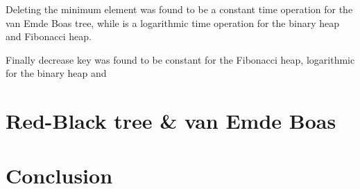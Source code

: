 \documentclass[a4paper,oneside,article,11pt]{memoir}
\begin{document}
Deleting the minimum element was found to be a constant time operation for the van Emde Boas tree, while is a logarithmic time operation for the binary heap and Fibonacci heap.

Finally decrease key was found to be constant for the Fibonacci heap, logarithmic for the binary heap and %

\chapter{Red-Black tree \& van Emde Boas}
\label{chap:treee}

\chapter{Conclusion}



\end{document}
